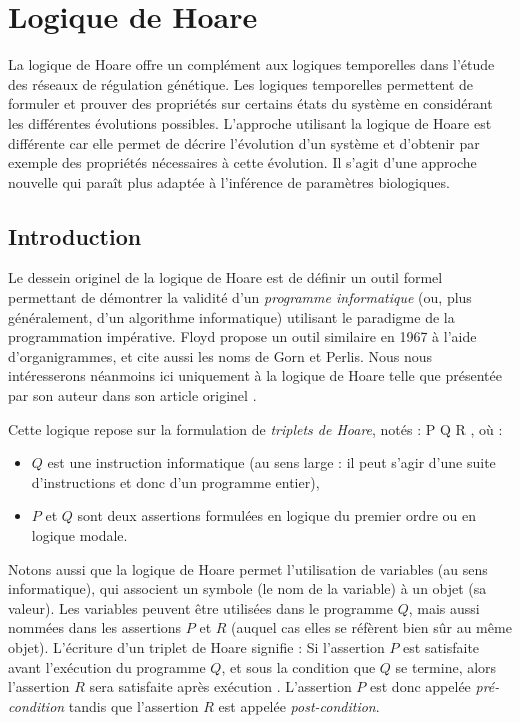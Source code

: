 \chapter{Logique de Hoare}
\label{hoare}
La logique de Hoare offre un complément aux logiques temporelles dans l'étude des réseaux de régulation génétique. Les logiques temporelles permettent de formuler et prouver des propriétés sur certains états du système en considérant les différentes évolutions possibles. L'approche utilisant la logique de Hoare est différente car elle permet de décrire l'évolution d'un système et d'obtenir par exemple des propriétés nécessaires à cette évolution. Il s'agit d'une approche nouvelle qui paraît plus adaptée à l'inférence de paramètres biologiques.
\section{Introduction}
Le dessein originel de la logique de Hoare est de définir un outil formel permettant de démontrer la validité d'un \emph{programme informatique} (ou, plus généralement, d'un algorithme informatique) utilisant le paradigme de la programmation impérative. Floyd propose un outil similaire en 1967 à l'aide d'organigrammes, et cite aussi les noms de Gorn et Perlis. Nous nous intéresserons néanmoins ici uniquement à la logique de Hoare telle que présentée par son auteur dans son article originel \cite{hoare-69}.

Cette logique repose sur la formulation de \emph{triplets de Hoare}, notés : \hbegini P \ha Q \hb R \hendi, où :
\begin{itemize}
  \item $Q$ est une instruction informatique (au sens large : il peut s'agir d'une suite d'instructions et donc d'un programme entier),
  \item $P$ et $Q$ sont deux assertions formulées en logique du premier ordre ou en logique modale.
\end{itemize}
Notons aussi que la logique de Hoare permet l'utilisation de variables (au sens informatique), qui associent un symbole (le nom de la variable) à un objet (sa valeur). Les variables peuvent être utilisées dans le programme $Q$, mais aussi nommées dans les assertions $P$ et $R$ (auquel cas elles se réfèrent bien sûr au même objet). L'écriture d'un triplet de Hoare signifie : \og Si l'assertion $P$ est satisfaite avant l'exécution du programme $Q$, et sous la condition que $Q$ se termine, alors l'assertion $R$ sera satisfaite après exécution \fg. L'assertion $P$ est donc appelée \emph{pré-condition} tandis que l'assertion $R$ est appelée \emph{post-condition}.

